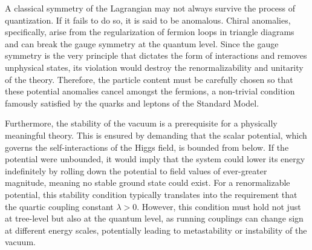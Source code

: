 A classical symmetry of the Lagrangian may not always survive the process of quantization. If it fails to do so, it is said to be anomalous. Chiral anomalies, specifically, arise from the regularization of fermion loops in triangle diagrams and can break the gauge symmetry at the quantum level. Since the gauge symmetry is the very principle that dictates the form of interactions and removes unphysical states, its violation would destroy the renormalizability and unitarity of the theory. Therefore, the particle content must be carefully chosen so that these potential anomalies cancel amongst the fermions, a non-trivial condition famously satisfied by the quarks and leptons of the Standard Model.

Furthermore, the stability of the vacuum is a prerequisite for a physically meaningful theory. This is ensured by demanding that the scalar potential, which governs the self-interactions of the Higgs field, is bounded from below. If the potential were unbounded, it would imply that the system could lower its energy indefinitely by rolling down the potential to field values of ever-greater magnitude, meaning no stable ground state could exist. For a renormalizable potential, this stability condition typically translates into the requirement that the quartic coupling constant $\lambda > 0$. However, this condition must hold not just at tree-level but also at the quantum level, as running couplings can change sign at different energy scales, potentially leading to metastability or instability of the vacuum.

